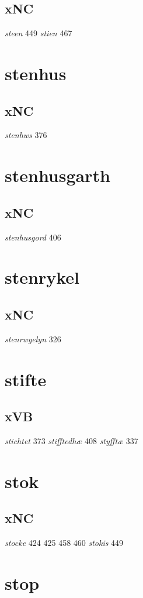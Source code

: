 \documentclass[a4paper,twocolumn]{article}
\begin{document}
\subsection{xNC}
\label{sec:orga493ddc}
\emph{steen} 449 \emph{stien} 467 
\section{stenhus}
\label{sec:orgb0e0fdb}
\subsection{xNC}
\label{sec:org568aae1}
\emph{stenhws} 376 
\section{stenhusgarth}
\label{sec:orgd7fdfd7}
\subsection{xNC}
\label{sec:org643bf1e}
\emph{stenhusgord} 406 
\section{stenrykel}
\label{sec:org0d34eca}
\subsection{xNC}
\label{sec:orgafd3d27}
\emph{stenrwgelyn} 326 
\section{stifte}
\label{sec:org8cb4d16}
\subsection{xVB}
\label{sec:org657f27e}
\emph{stichtet} 373 \emph{stifftedhæ} 408 \emph{styfftæ} 337 
\section{stok}
\label{sec:org3c34522}
\subsection{xNC}
\label{sec:orgdba7b98}
\emph{stocke} 424 425 458 460 \emph{stokis} 449 
\section{stop}
\label{sec:org167716f}
\end{document}
